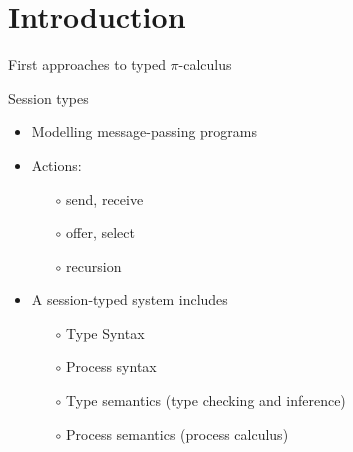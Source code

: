 \section{Introduction}
\begin{frame}{First approaches to typed $\pi$-calculus}

\end{frame}

\begin{frame}{Session types}
  \begin{itemize}
    \item Modelling message-passing programs
    \item Actions:
          \begin{itemize}
            \item [$\circ$] send, receive
            \item [$\circ$] offer, select
            \item [$\circ$] recursion
          \end{itemize}
    \item A session-typed system includes
          \begin{itemize}
            \item [$\circ$] Type Syntax
            \item [$\circ$] Process syntax
            \item [$\circ$] Type semantics (type checking and inference)
            \item [$\circ$] Process semantics (process calculus)
          \end{itemize}
  \end{itemize}
\end{frame}